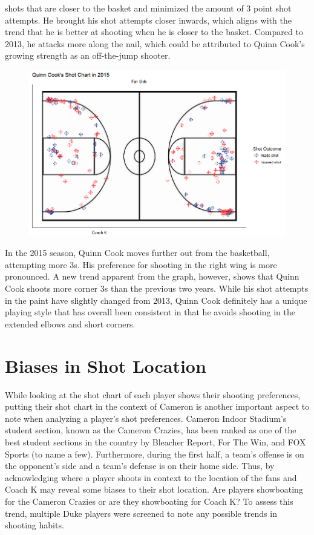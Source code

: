 \documentclass[12pt,twoside]{dukestatscithesis}
\theoremstyle{definition}
\theoremstyle{definition}
\theoremstyle{definition}
\theoremstyle{remark}
\begin{document}
shots that are closer to the basket and minimized the amount of 3 point
shot attempts. He brought his shot attempts closer inwards, which aligns
with the trend that he is better at shooting when he is closer to the
basket. Compared to 2013, he attacks more along the nail, which could be
attributed to Quinn Cook's growing strength as an off-the-jump shooter.
\begin{figure}
\centering
\includegraphics{img/shotchart_quinncook2015.png}
\caption{}
\end{figure}
In the 2015 season, Quinn Cook moves further out from the basketball,
attempting more 3s. His preference for shooting in the right wing is
more pronounced. A new trend apparent from the graph, however, shows
that Quinn Cook shoots more corner 3s than the previous two years. While
his shot attempts in the paint have slightly changed from 2013, Quinn
Cook definitely has a unique playing style that has overall been
consistent in that he avoids shooting in the extended elbows and short
corners.

\section{Biases in Shot Location}\label{biases-in-shot-location}

While looking at the shot chart of each player shows their shooting
preferences, putting their shot chart in the context of Cameron is
another important aspect to note when analyzing a player's shot
preferences. Cameron Indoor Stadium's student section, known as the
Cameron Crazies, has been ranked as one of the best student sections in
the country by Bleacher Report, For The Win, and FOX Sports (to name a
few). Furthermore, during the first half, a team's offense is on the
opponent's side and a team's defense is on their home side. Thus, by
acknowledging where a player shoots in context to the location of the
fans and Coach K may reveal some biases to their shot location. Are
players showboating for the Cameron Crazies or are they showboating for
Coach K? To assess this trend, multiple Duke players were screened to
note any possible trends in shooting habits.
\end{document}
